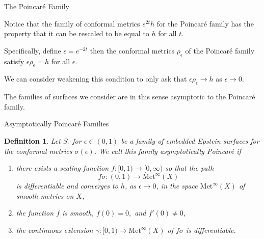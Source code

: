 \documentclass[professionalfont]{beamer}
\newtheorem{defn}{Definition}
\begin{document}
\begin{frame}{The Poincar\'e Family}

Notice that the family of conformal metrics $e^{2t}h$ for the Poincar\'e family has the property that it can be rescaled to be equal to $h$ for all $t$. \pause
\newline

Specifically, define $\epsilon = e^{-2t}$ then the conformal metrics $\rho_\epsilon$ of the Poincar\'e family satisfy $\epsilon \rho_\epsilon = h$ for all $\epsilon$. \pause
\newline

We can consider weakening this condition to only ask that $\epsilon \rho_\epsilon \to h$ as $\epsilon \to 0$. \pause
\newline

The families of surfaces we consider are in this sense asymptotic to the Poincar\'e family.


\end{frame}



\begin{frame}{Asymptotically Poincar\'e Families}

\begin{defn}
\label{asym-def}
Let $S_\epsilon$ for $\epsilon \in (0,1)$ be a family of embedded Epstein surfaces for the conformal metrics $\sigma(\epsilon)$. 
We call this family \emph{asymptotically Poincar\'e} if \pause
\begin{enumerate}
    \item there exists a scaling function $f:[0,1) \to [0,\infty)$ so that the path
    \[
f\sigma:(0,1) \to \mathrm{Met}^\infty(X)
\]
is differentiable and converges to $h$, as $\epsilon \to 0$, in the space $\mathrm{Met}^\infty(X)$ of smooth metrics on $X$, \pause
    \item the function $f$ is smooth, $f(0) = 0,$ and $f'(0) \neq 0$, \pause
    \item the continuous extension $\gamma:[0,1) \to \mathrm{Met}^\infty(X)$ of $f \sigma$ is differentiable.
\end{enumerate}

\end{defn}

\end{frame}


\end{document}
